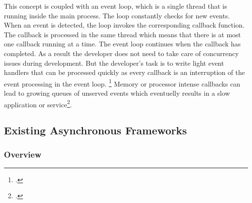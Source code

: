 

This concept is coupled with an event loop, which is a single thread that is
running inside the main process.
The loop constantly checks for new events. When an event is detected, the loop
invokes the corresponding callback function. The callback is processed in the
same thread which means that there is at most one callback running at a time.
The event loop continues when the callback has completed. As a result the
developer does not need to take care of concurrency issues during development.
But the developer's task is to write light event handlers that can be processed
quickly as every callback is an interruption of the event processing in the
event loop. \footcite[Cf.][]{Croucher_2010} Memory or processor intense callbacks
can lead to growing queues of unserved events which eventuelly results
in a slow application or service\footcite[Cf.][48]{teixeira_2012}.





\subsection{Existing Asynchronous Frameworks}
\label{existing_frameworks}


\subsubsection{Overview}
\label{frameworks_overview}

